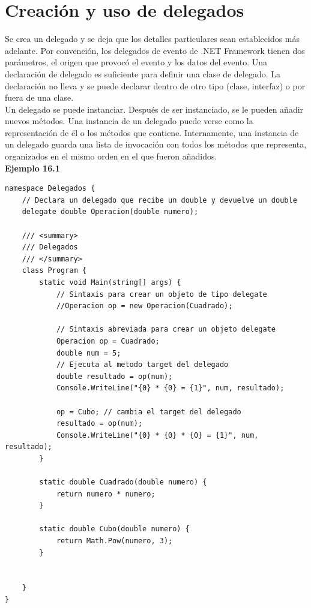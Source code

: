 \documentclass[12pt,a4paper]{report}
\begin{document}
\section{Creación y uso de delegados}
Se crea un delegado y se deja que los detalles particulares sean establecidos más adelante. Por convención, los delegados de evento de .NET Framework tienen dos parámetros, el origen que provocó el evento y los datos del evento. Una declaración de delegado es suficiente para definir una clase de delegado. La declaración no lleva { } y se puede declarar dentro de otro tipo (clase, interfaz) o por fuera de una clase.\\Un delegado se puede instanciar. Después de ser instanciado, se le pueden añadir nuevos métodos. Una instancia de un delegado puede verse como la representación de él o los métodos que contiene. Internamente, una instancia de un delegado guarda una lista de invocación con todos los métodos que representa, organizados en el mismo orden en el que fueron añadidos.\\\textbf{Ejemplo 16.1}
\begin{lstlisting}
namespace Delegados {
    // Declara un delegado que recibe un double y devuelve un double
    delegate double Operacion(double numero);

    /// <summary>
    /// Delegados
    /// </summary>
    class Program {
        static void Main(string[] args) {                    
            // Sintaxis para crear un objeto de tipo delegate
            //Operacion op = new Operacion(Cuadrado);

            // Sintaxis abreviada para crear un objeto delegate
            Operacion op = Cuadrado;
            double num = 5;
            // Ejecuta al metodo target del delegado
            double resultado = op(num);
            Console.WriteLine("{0} * {0} = {1}", num, resultado);

            op = Cubo; // cambia el target del delegado
            resultado = op(num);
            Console.WriteLine("{0} * {0} * {0} = {1}", num, resultado);
        }

        static double Cuadrado(double numero) {
            return numero * numero;
        }

        static double Cubo(double numero) {
            return Math.Pow(numero, 3);
        }


    }
}
\end{lstlisting}
\end{document}
